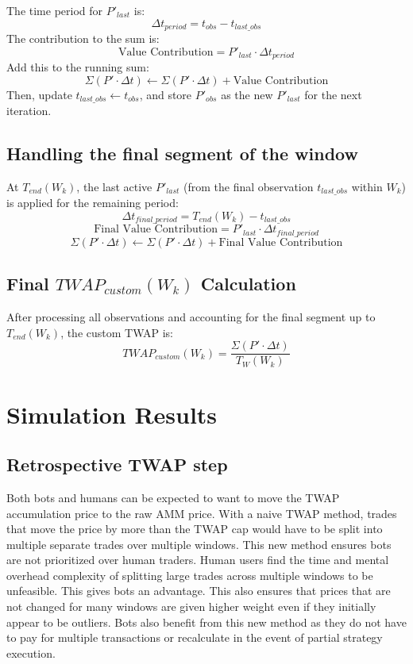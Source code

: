\documentclass{article}
\begin{document}
The time period for $P'_{last}$ is:
\[ \Delta t_{period} = t_{obs} - t_{last\_obs} \]
The contribution to the sum is:
\[ \text{Value Contribution} = P'_{last} \cdot \Delta t_{period} \]
Add this to the running sum:
\[ \Sigma (P' \cdot \Delta t) \leftarrow \Sigma (P' \cdot \Delta t) + \text{Value Contribution} \]
Then, update $t_{last\_obs} \leftarrow t_{obs}$, and store $P'_{obs}$ as the new $P'_{last}$ for the next iteration.

\subsection*{Handling the final segment of the window}
At $T_{end}(W_k)$, the last active $P'_{last}$ (from the final observation $t_{last\_obs}$ within $W_k$) is applied for the remaining period:
\[ \Delta t_{final\_period} = T_{end}(W_k) - t_{last\_obs} \]
\[ \text{Final Value Contribution} = P'_{last} \cdot \Delta t_{final\_period} \]
\[ \Sigma (P' \cdot \Delta t) \leftarrow \Sigma (P' \cdot \Delta t) + \text{Final Value Contribution} \]

\subsection*{Final $TWAP_{custom}(W_k)$ Calculation}
After processing all observations and accounting for the final segment up to $T_{end}(W_k)$, the custom TWAP is:
\[ TWAP_{custom}(W_k) = \frac{\Sigma (P' \cdot \Delta t)}{T_W(W_k)} \]

\section{Simulation Results}

\subsection{Retrospective TWAP step}
Both bots and humans can be expected to want to move the TWAP accumulation price to the raw AMM price. With a naive TWAP method, trades that move the price by more than the TWAP cap would have to be split into multiple separate trades over multiple windows. This new method ensures bots are not prioritized over human traders. Human users find the time and mental overhead complexity of splitting large trades across multiple windows to be unfeasible. This gives bots an advantage. This also ensures that prices that are not changed for many windows are given higher weight even if they initially appear to be outliers. Bots also benefit from this new method as they do not have to pay for multiple transactions or recalculate in the event of partial strategy execution.
\end{document}
